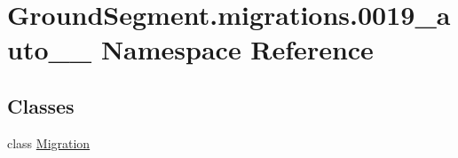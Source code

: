 \hypertarget{namespace_ground_segment_1_1migrations_1_10019__auto__20161202__1004}{}\section{Ground\+Segment.\+migrations.0019\+\_\+auto\+\_\+\_ Namespace Reference}
\label{namespace_ground_segment_1_1migrations_1_10019__auto__20161202__1004}
\subsection*{Classes}
\begin{DoxyCompactItemize}
\item 
class \hyperlink{class_ground_segment_1_1migrations_1_10019__auto__20161202__1004_1_1_migration}{Migration}
\end{DoxyCompactItemize}

